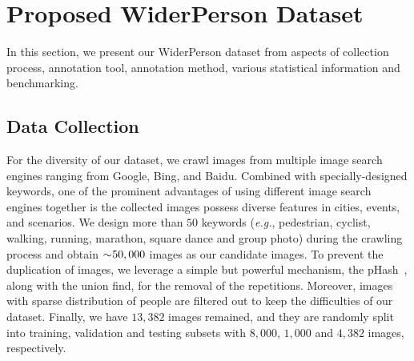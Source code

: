 \documentclass[journal]{IEEEtran}
\def\eg{{\em e.g.}}
\begin{document}
\section{Proposed WiderPerson Dataset}\label{3}
In this section, we present our WiderPerson dataset from aspects of collection process, annotation tool, annotation method, various statistical information and benchmarking.

\subsection{Data Collection}
For the diversity of our dataset, we crawl images from multiple image search engines ranging from Google, Bing, and Baidu. Combined with specially-designed keywords, one of the prominent advantages of using different image search engines together is the collected images possess diverse features in cities, events, and scenarios. We design more than $50$ keywords (\eg, pedestrian, cyclist, walking, running, marathon, square dance and group photo) during the crawling process and obtain $\sim\negmedspace50,000$ images as our candidate images. To prevent the duplication of images, we leverage a simple but powerful mechanism, the pHash~\cite{DBLP:conf/ccs/MihcakV01}, along with the union find, for the removal of the repetitions. Moreover, images with sparse distribution of people are filtered out to keep the difficulties of our dataset. Finally, we have $13,382$ images remained, and they are randomly split into training, validation and testing subsets with $8,000$, $1,000$ and $4,382$ images, respectively.
\end{document}
